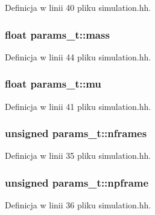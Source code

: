 Definicja w linii 40 pliku simulation.\+hh.

\hypertarget{structparams__t_afe4a59fe43565a71a0a7a155714e2af1}{}
\subsubsection[{mass}]{\setlength{\rightskip}{0pt plus 5cm}float params\+\_\+t\+::mass}\label{structparams__t_afe4a59fe43565a71a0a7a155714e2af1}


Definicja w linii 44 pliku simulation.\+hh.

\hypertarget{structparams__t_a971359c29b2f946b477e4a1b3605fa3f}{}
\subsubsection[{mu}]{\setlength{\rightskip}{0pt plus 5cm}float params\+\_\+t\+::mu}\label{structparams__t_a971359c29b2f946b477e4a1b3605fa3f}


Definicja w linii 41 pliku simulation.\+hh.

\hypertarget{structparams__t_a2cecc28f4ca024657cf567047e2aba59}{}
\subsubsection[{nframes}]{\setlength{\rightskip}{0pt plus 5cm}unsigned params\+\_\+t\+::nframes}\label{structparams__t_a2cecc28f4ca024657cf567047e2aba59}


Definicja w linii 35 pliku simulation.\+hh.

\hypertarget{structparams__t_a06a1a567fd5ba13905514227e2bb710a}{}
\subsubsection[{npframe}]{\setlength{\rightskip}{0pt plus 5cm}unsigned params\+\_\+t\+::npframe}\label{structparams__t_a06a1a567fd5ba13905514227e2bb710a}


Definicja w linii 36 pliku simulation.\+hh.

\hypertarget{structparams__t_a2eb309edb681d0a998f23fc692a73781}{}
